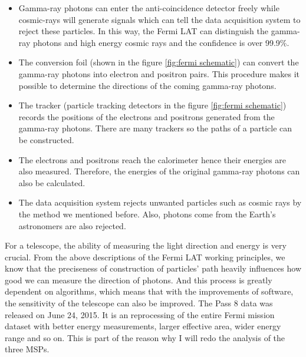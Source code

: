 \documentclass[12pt]{report}
\begin{document}
        \begin{itemize}
          \item Gamma-ray photons can enter the anti-coincidence detector freely while cosmic-rays will generate
            signals which can tell the data acquisition system to reject these particles. In this way, the 
            Fermi LAT can distinguish the gamma-ray photons and high energy cosmic rays and the confidence is 
            over 99.9\%. 
          \item The conversion foil (shown in the figure \ref{fig:fermi schematic}) can convert the 
            gamma-ray photons into electron and positron pairs. This procedure makes it possible to determine 
            the directions of the coming gamma-ray photons. 
          \item The tracker (particle tracking detectors in the figure \ref{fig:fermi schematic}) records the 
            positions of the electrons and positrons generated from the gamma-ray photons. There are many 
            trackers so the paths of a particle can be constructed.
          \item The electrons and positrons reach the calorimeter hence their energies are also measured.
            Therefore, the energies of the original gamma-ray photons can also be calculated. 
          \item The data acquisition system rejects unwanted particles such as cosmic rays by the method we mentioned 
            before. Also, photons come from the Earth's astronomers are also rejected. 
        \end{itemize}
      
        For a telescope, the ability of measuring the light direction and energy is very crucial. 
        From the above descriptions of the Fermi LAT working principles, we know that the preciseness of 
        construction of particles' path heavily influences how good we can measure the direction of photons. 
        And this process is greatly dependent on algorithms, which means that with the improvements of software,
        the sensitivity of the telescope can also be improved. The Pass 8 data was released on June 24, 2015.
        It is an reprocessing of the entire Fermi mission dataset with better energy measurements, larger effective 
        area, wider energy range and so on. This is part of the reason why I will redo the analysis of the three MSPs.
\end{document}
